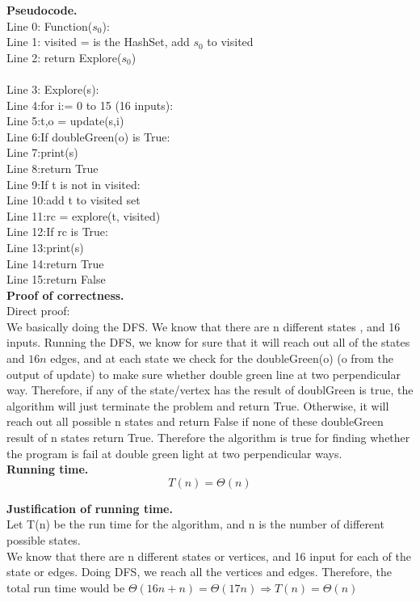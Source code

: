 \documentclass[11pt]{article}
\newcommand{\tab}{\hspace*{2em}}
\begin{document}
\noindent
\textbf{Pseudocode.}\\
Line 0: Function($s_0$):\\
Line 1: \tab visited = is the HashSet, add $s_0$ to visited \\
Line 2: \tab return Explore($s_0$)\\
\\
Line 3: Explore(s):\\
Line 4:\tab for i:= 0 to 15 (16 inputs):\\
Line 5:\tab\tab t,o = update(s,i)\\
Line 6:\tab\tab If doubleGreen(o) is True:\\
Line 7:\tab\tab\tab print(s)\\
Line 8:\tab\tab\tab return True\\
Line 9:\tab\tab If t is not in visited:\\
Line 10:\tab\tab\tab add t to visited set\\
Line 11:\tab\tab\tab rc = explore(t, visited)\\
Line 12:\tab\tab\tab If rc is True:\\
Line 13:\tab\tab\tab\tab print(s)\\
Line 14:\tab\tab\tab\tab return True\\
Line 15:\tab return False\\


\noindent
\textbf{Proof of correctness.}\\
Direct proof:\\
We basically doing the DFS. We know that there are n different states , and 16 inputs. Running the DFS, we know for sure that it will reach out all of the states and $16n$ edges, and at each state we check for the doubleGreen(o) (o from the output of update) to make sure whether double green line at two perpendicular way. Therefore, if any of the state/vertex has the result of doublGreen is true, the algorithm will just terminate the problem and return True. Otherwise, it will reach out all possible n states and return False if none of these doubleGreen result of n states return True. Therefore the algorithm is true for finding whether the program is fail at double green light at two perpendicular ways.\\


\noindent
\textbf{Running time.}\\
$$\boxed{T(n) = \Theta(n)}$$


\noindent
\textbf{Justification of running time.}\\
Let T(n) be the run time for the algorithm, and n is the number of different possible states.\\
We know that there are n different states or vertices, and 16 input for each of the state or edges. Doing DFS, we reach all the vertices and edges. Therefore, the total run time would be $\Theta(16n + n) = \Theta(17n) \Rightarrow \boxed{T(n) = \Theta(n)}$
\end{document}
